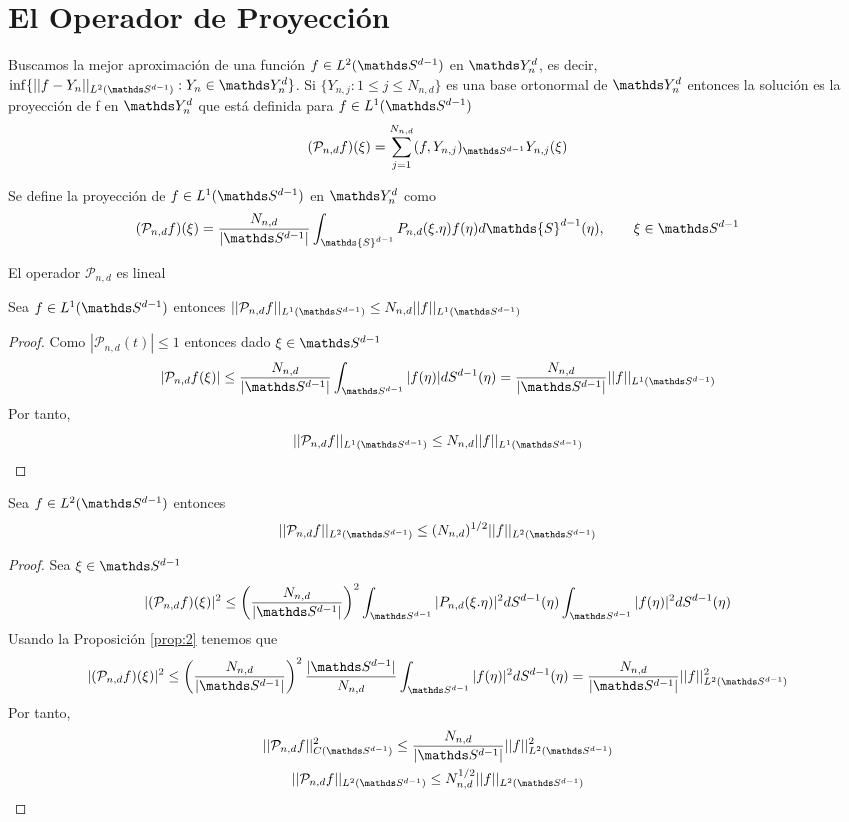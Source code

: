 \section{El Operador de Proyección}
Buscamos la mejor aproximación de una función $f\in L^2(\sphere)$ en $\spharm$, es decir, $\inf\{||f-Y_n||_{L^2(\sphere)}: Y_n \in \spharm\}$. Si $\{Y_{n,j} : 1\le j \le N_{n,d}\}$ es una base ortonormal de $\spharm$ entonces la solución es la proyección de f en $\spharm$ que está definida para $f\in L^1(\sphere)$ 
$$ (\mathcal{P}_{n,d}f)(\xi) = \sum_{j=1}^{N_{n,d}}(f,Y_{n,j})_{\sphere} Y_{n,j}(\xi)$$


\begin{defn}Se define la proyección de $f\in L^1(\sphere)$ en $\spharm$ como $$
		(\mathcal{P}_{n,d}f)(\xi) =\frac{N_{n,d}}{|\sphere|} \int_{\mathds{S}^{d-1}}P_{n,d}(\xi.\eta)f(\eta)d\mathds{S}^{d-1}(\eta),\qquad \xi\in\sphere
	$$
\end{defn}
\begin{rem}El operador $\mathcal{P}_{n,d}$ es lineal
\end{rem}
\begin{prop}Sea $f\in L^1(\sphere)$ entonces $||\mathcal{P}_{n,d}f||_{L^1(\sphere)} \le N_{n,d}||f||_{L^1(\sphere)}$
\end{prop}
\begin{proof}
Como $|\mathcal{P}_{n,d}(t)|\le 1$ entonces dado $\xi \in \sphere$
\begin{gather*}
|\mathcal{P}_{n,d}f(\xi)|\le \frac{N_{n,d}}{|\sphere|} \sphint |f(\eta)| dS^{d-1}(\eta) = \frac{N_{n,d}}{|\sphere|} ||f||_{L^1(\sphere)}
\end{gather*}
Por tanto, $$ ||\mathcal{P}_{n,d}f||_{L^1(\sphere)} \le N_{n,d}||f||_{L^1(\sphere)}$$
\end{proof}
\begin{prop}Sea $f \in L^2(\sphere)$ entonces $$||	\mathcal{P}_{n,d}f||_{L^2(\sphere)} \le (N_{n,d})^{1/2}||f||_{L^2(\sphere)}$$
\end{prop}
\begin{proof}
Sea $\xi \in \sphere$
\begin{gather*}
|(\mathcal{P}_{n,d}f)(\xi)|^2 \le \left(\frac{N_{n,d}}{|\sphere|}\right)^2 \sphint |P_{n,d}(\xi.\eta)|^2 dS^{d-1}(\eta) \sphint |f(\eta)|^2 dS^{d-1}(\eta)
\end{gather*}
Usando la Proposición \ref{prop:2} tenemos que 
\begin{gather*}
 |(\mathcal{P}_{n,d}f)(\xi)|^2 \le \left(\frac{N_{n,d}}{|\sphere|}\right)^2  \frac{|\sphere|}{N_{n,d}}  \sphint |f(\eta)|^2 dS^{d-1}(\eta)=\frac{N_{n,d}}{|\sphere|}||f||^2_{L^2(\sphere)}
\end{gather*}
Por tanto, \begin{gather*}
||\mathcal{P}_{n,d}f||^2_{C(\sphere)} \le \frac{N_{n,d}}{|\sphere|}||f||^2_{L^2(\sphere)} \\
||\mathcal{P}_{n,d}f||_{L^2(\sphere)} \le N_{n,d}^{1/2}||f||_{L^2(\sphere)}
\end{gather*} 
\end{proof}
